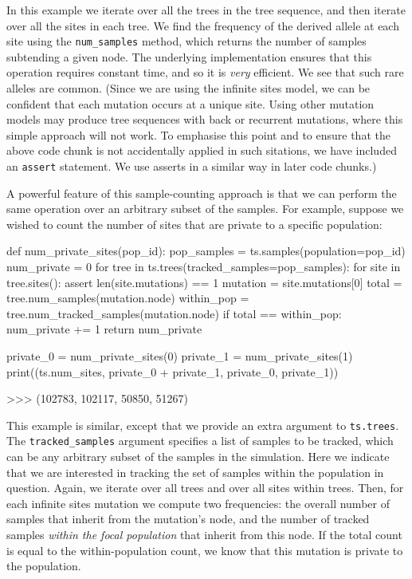 \documentclass[graybox]{svmult}
\begin{document}
In this example we iterate over all the trees in the tree sequence, and
then iterate over all the sites in each tree. We find the frequency
of the derived allele at each site using the \texttt{num\_samples}
method, which returns the number of samples subtending a given
node. The underlying implementation ensures that this operation requires
constant time, and so it is \emph{very} efficient. We see that such rare alleles are common.
(Since we are using the infinite sites model, we can be confident that
each mutation occurs at a unique site. Using other mutation models may produce
tree sequences with back or recurrent mutations, where this simple approach
will not work. To emphasise this point and to ensure that
the above code chunk is not accidentally applied in such sitations, we have included an
\texttt{assert} statement. We use asserts in a similar way in later code chunks.)

A powerful feature of this sample-counting approach is that we can
perform the same operation over an arbitrary subset of the samples. For
example, suppose we wished to count the number of sites that are private
to a specific population:

\begin{pythoncode}
def num_private_sites(pop_id):
    pop_samples = ts.samples(population=pop_id)
    num_private = 0
    for tree in ts.trees(tracked_samples=pop_samples):
        for site in tree.sites():
            assert len(site.mutations) == 1
            mutation = site.mutations[0]
            total = tree.num_samples(mutation.node)
            within_pop = tree.num_tracked_samples(mutation.node)
            if total == within_pop:
                num_private += 1
    return num_private

private_0 = num_private_sites(0)
private_1 = num_private_sites(1)
print((ts.num_sites, private_0 + private_1, private_0, private_1))

>>> (102783, 102117, 50850, 51267)
\end{pythoncode}

    This example is similar, except that we provide an extra argument to
\texttt{ts.trees}. The \texttt{tracked\_samples} argument specifies a list of samples to be tracked, which can be
any arbitrary subset of the samples in the simulation. Here we indicate
that we are interested in tracking the set of samples within the
population in question. Again, we iterate over all trees and over all
sites within trees. Then, for each infinite sites mutation we
compute two frequencies: the overall number of samples that inherit from
the mutation's node, and the number of tracked samples \emph{within the focal
population} that inherit from this node. If the total count is
equal to the within-population count, we know that this mutation is private to the population.
\end{document}
